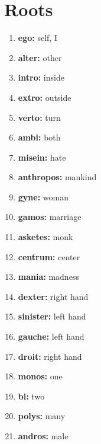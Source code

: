 \documentclass{article}
\begin{document}
\section{Roots}
\begin{enumerate}
    \item \textbf{ego: }{self, I}
    \item \textbf{alter: }{other}
    \item \textbf{intro: }{inside}
    \item \textbf{extro: }{outside}
    \item \textbf{verto: }{turn}
    \item \textbf{ambi: }{both}
    \item \textbf{misein: }{hate}
    \item \textbf{anthropos: }{mankind}
    \item \textbf{gyne: }{woman}
    \item \textbf{gamos: }{marriage}
    \item \textbf{asketes: }{monk}
    \item \textbf{centrum: }{center}
    \item \textbf{mania: }{madness}
    \item \textbf{dexter: }{right hand}
    \item \textbf{sinister: }{left hand}
    \item \textbf{gauche: }{left hand}
    \item \textbf{droit: }{right hand}
    \item \textbf{monos: }{one}
    \item \textbf{bi: }{two}
    \item \textbf{polys: }{many}
    \item \textbf{andros: }{male}
    
\end{enumerate}
\end{document}
